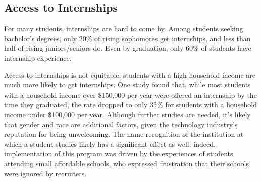 \subsection{Access to Internships}
For many students, internships are hard to come by. Among students seeking bachelor’s degrees, only 20\% of rising sophomores get internships, and less than half of rising juniors/seniors do. Even by graduation, only 60\% of students have internship experience. \cite{kapoorExploringParticipationCS2020, kocClass2014Student2014}

Access to internships is not equitable: students with a high household income are much more likely to get internships. One study found that, while most students with a household income over \$150,000 per year were offered an internship by the time they graduated, the rate dropped to only 35\% for students with a household income under \$100,000 per year. \cite{kapoorExploringParticipationCS2020} Although further studies are needed, it's likely that gender and race are additional factors, given the technology industry's reputation for being unwelcoming. The name recognition of the institution at which a student studies likely has a significant effect as well: indeed, implementation of this program was driven by the experiences of students attending small affordable schools, who expressed frustration that their schools were ignored by recruiters.